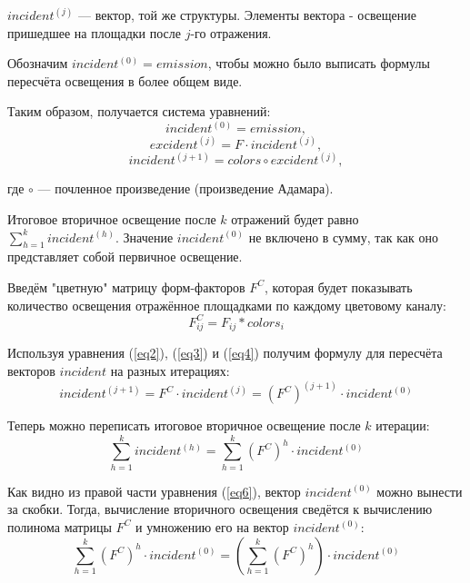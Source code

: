 \documentclass[12pt,fleqn]{article}
\begin{document}
$incident^{(j)}$ --- вектор, той же структуры. Элементы вектора - освещение пришедшее на площадки после $j$-го отражения.

Обозначим $incident^{(0)} = emission$, чтобы можно было выписать формулы пересчёта освещения в более общем виде.

Таким образом, получается система уравнений:
\begin{equation}
\label{eq1}
incident^{(0)} = emission,
\end{equation}
\begin{equation}
\label{eq2}
excident^{(j)} = F \cdot incident^{(j)},
\end{equation}
\begin{equation}
\label{eq3}
incident^{(j + 1)} = colors \circ excident^{(j)},
\end{equation}

где $\circ$ --- почленное произведение (произведение Адамара).

Итоговое вторичное освещение после $k$ отражений будет равно
$\sum\limits_{h = 1}^k incident^{(h)}$.
Значение $incident^{(0)}$ не включено в сумму, так как оно представляет собой первичное освещение.

Введём "цветную" матрицу форм-факторов $F^C$, которая будет показывать количество освещения отражённое площадками по каждому цветовому каналу:
\begin{equation}
\label{eq4}
F^C_{ij} = F_{ij} * colors_i
\end{equation}

Используя уравнения (\ref{eq2}), (\ref{eq3}) и (\ref{eq4}) получим формулу для пересчёта векторов $incident$ на разных итерациях:
\begin{equation}
\label{eq5}
incident^{(j + 1)} = F^C \cdot incident^{(j)} = \left( F^C \right) ^ {(j + 1)} \cdot incident^{(0)}
\end{equation}

Теперь можно переписать итоговое вторичное освещение после $k$ итерации:
\begin{equation}
\label{eq6}
\sum\limits_{h = 1}^k incident^{(h)} = \sum\limits_{h = 1}^k \left(F^C\right)^h \cdot incident^{(0)}
\end{equation}

Как видно из правой части уравнения (\ref{eq6}), вектор $incident^{(0)}$ можно вынести за скобки. Тогда, вычисление вторичного освещения сведётся к вычислению полинома матрицы $F^C$ и умножению его на вектор $incident^{(0)}$:
\begin{equation}
\label{eq7}
\sum\limits_{h = 1}^k \left(F^C\right)^h \cdot incident^{(0)} = \left(\sum\limits_{h = 1}^k \left(F^C\right)^h\right) \cdot incident^{(0)}
\end{equation}
\end{document}
